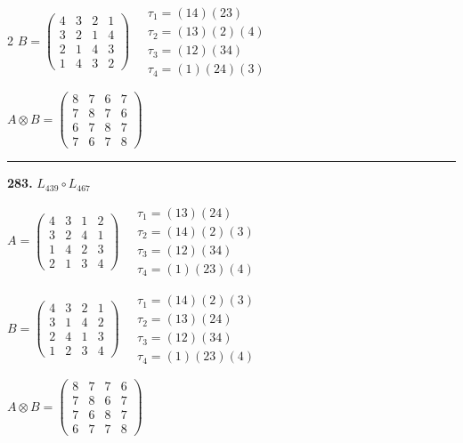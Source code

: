 \begin{multicols}{2}
$B = \begin{pmatrix} 4 & 3 & 2 & 1 \\ 3 & 2 & 1 & 4 \\ 2 & 1 & 4 & 3 \\ 1 & 4 & 3 & 2 \end{pmatrix} \quad \begin{matrix} \tau_{1}=(1 4)(2 3) \\ \tau_{2}=(1 3)(2)(4) \\ \tau_{3}=(1 2)(3 4) \\ \tau_{4}=(1)(2 4)(3) \end{matrix}$

$A \otimes B = \begin{pmatrix} 8 & 7 & 6 & 7 \\ 7 & 8 & 7 & 6 \\ 6 & 7 & 8 & 7 \\ 7 & 6 & 7 & 8 \end{pmatrix}$

\vspace{0.3em}
\hrule
\vspace{0.3em}

\noindent\textbf{283.} $L_{439} \circ L_{467}$

$A = \begin{pmatrix} 4 & 3 & 1 & 2 \\ 3 & 2 & 4 & 1 \\ 1 & 4 & 2 & 3 \\ 2 & 1 & 3 & 4 \end{pmatrix} \quad \begin{matrix} \tau_{1}=(1 3)(2 4) \\ \tau_{2}=(1 4)(2)(3) \\ \tau_{3}=(1 2)(3 4) \\ \tau_{4}=(1)(2 3)(4) \end{matrix}$

$B = \begin{pmatrix} 4 & 3 & 2 & 1 \\ 3 & 1 & 4 & 2 \\ 2 & 4 & 1 & 3 \\ 1 & 2 & 3 & 4 \end{pmatrix} \quad \begin{matrix} \tau_{1}=(1 4)(2)(3) \\ \tau_{2}=(1 3)(2 4) \\ \tau_{3}=(1 2)(3 4) \\ \tau_{4}=(1)(2 3)(4) \end{matrix}$

$A \otimes B = \begin{pmatrix} 8 & 7 & 7 & 6 \\ 7 & 8 & 6 & 7 \\ 7 & 6 & 8 & 7 \\ 6 & 7 & 7 & 8 \end{pmatrix}$


\end{multicols}
